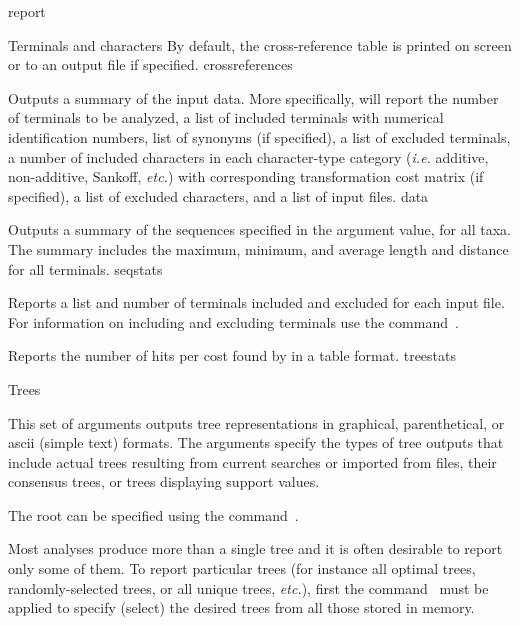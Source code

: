 \begin{command}{report}{}
\begin{arguments}
\begin{argumentgroup}{Terminals and characters}
{                By default, the cross-reference table is printed on screen or to an
                output file if specified.}
                {crossreferences}

                {Outputs a summary of the input data.
                More specifically, \poy will report the number of
                terminals to be analyzed, a list of included terminals with
                numerical identification numbers, list
                of synonyms (if specified), a list of excluded terminals, a
                number of included characters in each character-type category
                (\emph{i.e.} additive, non-additive, Sankoff, \emph{etc.}) with corresponding
                transformation cost matrix (if specified), a list of excluded
                characters, and a list of input files.} 
                {data}

                {Outputs a summary of the sequences specified in the argument
                value, for all taxa. The summary includes the maximum, minimum,
                and average length and distance for all terminals.}
                {seqstats}

                {Reports a list and number of terminals included and excluded
                for each input file. For information on including and excluding
                terminals use the command~.}
                {}

                {Reports the number of hits per cost found by \poy in a table
                format.}
                {treestats}

		\end{argumentgroup}

		\begin{argumentgroup}{Trees}
            {This set of arguments outputs tree representations
            in graphical, parenthetical, or ascii (simple text) formats.
            The arguments specify the types of tree outputs that include
            actual trees resulting from current searches or imported from
            files, their consensus trees, or trees displaying support values.
            
            The root can be specified using the command~.
            
            Most analyses produce more than a single tree and it is
            often desirable to report only some of them. To
            report particular trees (for instance all optimal trees,
            randomly-selected trees, or all unique trees, \emph{etc.}), first the
            command~ must be applied to specify (select)
             the desired trees from all those stored in memory.} 


\end{argumentgroup}
\end{arguments}
\end{command}
